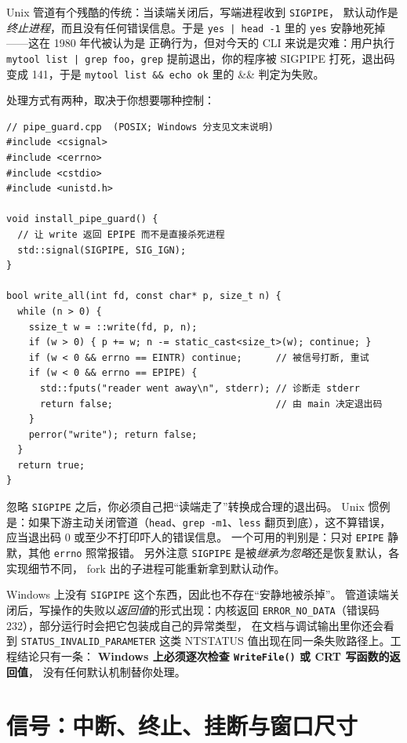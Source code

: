 \documentclass[12pt,a4paper,fontset=fandol]{ctexbook}
\newcommand{\Fn}[1]{\texttt{#1()}}
\newcommand{\Tp}[1]{\texttt{#1}}
\begin{document}
Unix 管道有个残酷的传统：当读端关闭后，写端进程收到 \Tp{SIGPIPE}，
默认动作是\emph{终止进程}，而且没有任何错误信息。于是
\Tp{yes | head -1} 里的 \Tp{yes} 安静地死掉——这在 1980 年代被认为是
正确行为，但对今天的 CLI 来说是灾难：用户执行
\Tp{mytool list | grep foo}，\Tp{grep} 提前退出，你的程序被 SIGPIPE
打死，退出码变成 141，于是 \Tp{mytool list \&\& echo ok} 里的 \&\&
判定为失败。

处理方式有两种，取决于你想要哪种控制：

\begin{lstlisting}[caption={接管 SIGPIPE 并把 EPIPE 变成可控错误}]
// pipe_guard.cpp  (POSIX; Windows 分支见文末说明)
#include <csignal>
#include <cerrno>
#include <cstdio>
#include <unistd.h>

void install_pipe_guard() {
  // 让 write 返回 EPIPE 而不是直接杀死进程
  std::signal(SIGPIPE, SIG_IGN);
}

bool write_all(int fd, const char* p, size_t n) {
  while (n > 0) {
    ssize_t w = ::write(fd, p, n);
    if (w > 0) { p += w; n -= static_cast<size_t>(w); continue; }
    if (w < 0 && errno == EINTR) continue;      // 被信号打断, 重试
    if (w < 0 && errno == EPIPE) {
      std::fputs("reader went away\n", stderr); // 诊断走 stderr
      return false;                             // 由 main 决定退出码
    }
    perror("write"); return false;
  }
  return true;
}
\end{lstlisting}

\begin{warning}[title={SIGPIPE 与退出码 141}]
忽略 \Tp{SIGPIPE} 之后，你必须自己把``读端走了''转换成合理的退出码。
Unix 惯例是：如果下游主动关闭管道（\Tp{head}、\Tp{grep -m1}、\Tp{less}
翻页到底），这不算错误，应当退出码 0 或至少不打印吓人的错误信息。
一个可用的判别是：只对 \Tp{EPIPE} 静默，其他 \Tp{errno} 照常报错。
另外注意 \Tp{SIGPIPE} 是被\emph{继承为忽略}还是恢复默认，各实现细节不同，
fork 出的子进程可能重新拿到默认动作。
\end{warning}

Windows 上没有 \Tp{SIGPIPE} 这个东西，因此也不存在``安静地被杀掉''。
管道读端关闭后，写操作的失败以\emph{返回值}的形式出现：内核返回
\Tp{ERROR\_NO\_DATA}（错误码 232），部分运行时会把它包装成自己的异常类型，
在文档与调试输出里你还会看到 \Tp{STATUS\_INVALID\_PARAMETER}
这类 NTSTATUS 值出现在同一条失败路径上。工程结论只有一条：
\textbf{Windows 上必须逐次检查 \Fn{WriteFile} 或 CRT 写函数的返回值}，
没有任何默认机制替你处理。

\section{信号：中断、终止、挂断与窗口尺寸}
\end{document}
